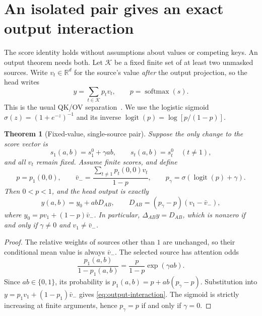 \documentclass[11pt]{article}
\newcommand{\R}{\mathbb{R}}
\newcommand{\softmax}{\operatorname{softmax}}
\newcommand{\logit}{\operatorname{logit}}
\newcommand{\pairdiff}{\Delta_{AB}}
\theoremstyle{plain}
\newtheorem{theorem}[proposition]{Theorem}
\theoremstyle{definition}
\theoremstyle{remark}
\begin{document}
\section{An isolated pair gives an exact output interaction}

The score identity holds without assumptions about values or competing keys. An output theorem needs both. Let $\mathcal K$ be a fixed finite set of at least two unmasked sources. Write $v_t\in\R^d$ for the source's value \emph{after} the output projection, so the head writes
\begin{equation}
 y=\sum_{t\in\mathcal K}p_t v_t,
 \qquad p=\softmax(s).
\label{eq:head-output}
\end{equation}
This is the usual QK/OV separation~\cite{elhage2021}. We use the logistic sigmoid $\sigma(z)=(1+e^{-z})^{-1}$ and its inverse $\logit(p)=\log[p/(1-p)]$.

\begin{theorem}[Fixed-value, single-source pair]\label{thm:output}
Suppose the only change to the score vector is
\begin{equation}
 s_1(a,b)=s_1^0+\gamma ab,
 \qquad s_t(a,b)=s_t^0\quad(t\ne1),
\label{eq:isolated-score}
\end{equation}
and all $v_t$ remain fixed. Assume finite scores, and define
\begin{equation}
 p=p_1(0,0),\qquad
 \bar v_- =\frac{\sum_{t\ne1}p_t(0,0)v_t}{1-p},\qquad
 p_\gamma=\sigma\!\left(\logit(p)+\gamma\right).
\label{eq:competitors}
\end{equation}
Then $0<p<1$, and the head output is exactly
\begin{equation}
 \boxed{y(a,b)=y_0+abD_{AB},\qquad
 D_{AB}=(p_\gamma-p)(v_1-\bar v_-),}
\label{eq:output-interaction}
\end{equation}
where $y_0=pv_1+(1-p)\bar v_-$. In particular, $\pairdiff y=D_{AB}$, which is nonzero if and only if $\gamma\ne0$ and $v_1\ne\bar v_-$.
\end{theorem}

\begin{proof}
The relative weights of sources other than $1$ are unchanged, so their conditional mean value is always $\bar v_-$. The selected source has attention odds
\[
 \frac{p_1(a,b)}{1-p_1(a,b)}
   =\frac{p}{1-p}\exp(\gamma ab).
\]
Since $ab\in\{0,1\}$, its probability is $p_1(a,b)=p+ab(p_\gamma-p)$. Substitution into $y=p_1v_1+(1-p_1)\bar v_-$ gives \cref{eq:output-interaction}. The sigmoid is strictly increasing at finite arguments, hence $p_\gamma=p$ if and only if $\gamma=0$.
\end{proof}
\end{document}

